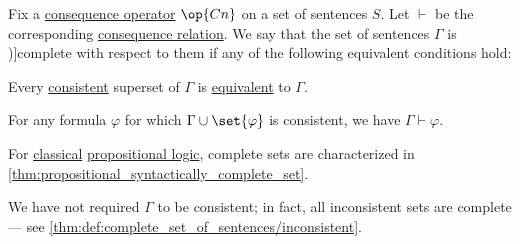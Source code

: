 \begin{definition}\label{def:complete_set_of_sentences}
  Fix a \hyperref[def:consequence_operator]{consequence operator} \( \op{Cn} \) on a set of sentences \( S \). Let \( {\vdash} \) be the corresponding \hyperref[def:consequence_relation]{consequence relation}. We say that the set of sentences \( \Gamma \) is \term[ru=полное (множество формул) (\cite[def. 1.3.16]{Герасимов2014Вычислимость})]{complete} with respect to them if any of the following equivalent conditions hold:
  \begin{thmenum}
     Every \hyperref[def:consistent_set_of_sentences]{consistent} superset of \( \Gamma \) is \hyperref[def:propositional_semantics/equivalence]{equivalent} to \( \Gamma \).

    \mimprovised For any formula \( \varphi \) for which \( \Gamma \cup \set{ \varphi } \) is consistent, we have \( \Gamma \vdash \varphi \).
  \end{thmenum}
\end{definition}
\begin{comments}
  \item For \hyperref[con:classical_logic]{classical} \hyperref[def:propositional_logic]{propositional logic}, complete sets are characterized in \cref{thm:propositional_syntactically_complete_set}.

  \item We have not required \( \Gamma \) to be consistent; in fact, all inconsistent sets are complete --- see \cref{thm:def:complete_set_of_sentences/inconsistent}.
\end{comments}
